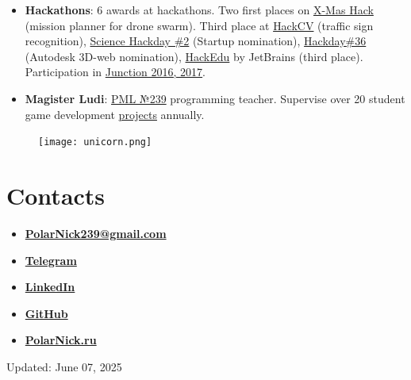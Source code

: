 \documentclass[11pt,oneside]{article}
\newcommand{\hhref}[2]{\href{#1}{\color{blue}#2}}
\begin{document}
\begin{itemize}
    \item{\textbf{Hackathons}}: 6 awards at hackathons. Two first places on \hhref{https://github.com/PolarNick239/HackathonDroneSwarm}{X-Mas Hack} (mission planner for drone swarm). Third place at \hhref{https://career.luxoft.com/lp/hack-cv/}{HackCV} (traffic sign recognition), \hhref{http://hackday.ru/sciencehackday-2/projects\#project-1400}{Science Hackday \#2} (Startup nomination), \hhref{http://hackday.ru/hackday-36/projects\#project-1121}{Hackday\#36} (Autodesk 3D-web nomination), \hhref{https://www.hackerleague.org/hackathons/jetbrains-edtech-hackathon/blogposts/53655896e24d32cfbd000006}{HackEdu} by JetBrains (third place). Participation in \hhref{http://www.hackjunction.com/}{Junction 2016, 2017}.

    \item{\textbf{Magister Ludi}}: \hhref{http://239.ru}{PML №239} programming teacher. Supervise over 20 student game development \hhref{https://www.youtube.com/watch?v=bbKXnsysUXw}{projects} annually.
\end{itemize}

\begin{figure}
    \centering
    \texttt{[image: unicorn.png]}
\end{figure}

\vspace{-9pt}
\section*{\textbf{Contacts}}
\vspace{-9pt}

\begin{itemize}

    \item{\textbf{\hhref{mailto:PolarNick239@gmail.com}{PolarNick239@gmail.com}}}

    \item{\textbf{\hhref{https://t.me/polarnick239}{Telegram}}}

    \item{\textbf{\hhref{https://www.linkedin.com/in/nikolai-poliarnyi-61393b7b}{LinkedIn}}}

    \item{\textbf{\hhref{https://github.com/PolarNick239}{GitHub}}}

    \item{\textbf{\hhref{http://polarnick239.github.io/index_ru.html}{PolarNick.ru}}}

\end{itemize}

Updated: June 07, 2025
\end{document}
